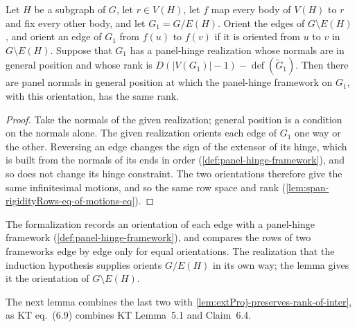 \begin{lemma}
  \label{lem:rank-transport-relabel-of-le-finrank}
  \leanok
  Let $H$ be a subgraph of $G$, let $r \in V(H)$, let $f$ map every body
  of $V(H)$ to $r$ and fix every other body, and let $G_1 = G/E(H)$.
  Orient the edges of $G \setminus E(H)$, and orient an edge of $G_1$
  from $f(u)$ to $f(v)$ if it is oriented from $u$ to $v$ in
  $G \setminus E(H)$. Suppose that $G_1$ has a panel-hinge realization
  whose normals are in general position and whose rank is
  $D(|V(G_1)|-1) - \operatorname{def}(\tilde G_1)$. Then there are panel
  normals in general position at which the panel-hinge framework on $G_1$,
  with this orientation, has the same rank.
\end{lemma}
\begin{proof}
  \leanok
  Take the normals of the given realization; general position is a
  condition on the normals alone. The given realization orients each edge
  of $G_1$ one way or the other. Reversing an edge changes the sign of the
  extensor of its hinge, which is built from the normals of its ends in
  order (\cref{def:panel-hinge-framework}), and so does not change its
  hinge constraint. The two orientations therefore give the same
  infinitesimal motions, and so the same row space and rank
  (\cref{lem:span-rigidityRows-eq-of-motions-eq}).
\end{proof}

\begin{fmlnote}
  The formalization records an orientation of each edge with a
  panel-hinge framework (\cref{def:panel-hinge-framework}), and compares
  the rows of two frameworks edge by edge only for equal orientations.
  The realization that the induction hypothesis supplies orients
  $G/E(H)$ in its own way; the lemma gives it the orientation of
  $G \setminus E(H)$.
\end{fmlnote}

The next lemma combines the last two with
\cref{lem:extProj-preserves-rank-of-inter}, as KT eq.~(6.9) combines KT
Lemma~5.1 and Claim~6.4.

